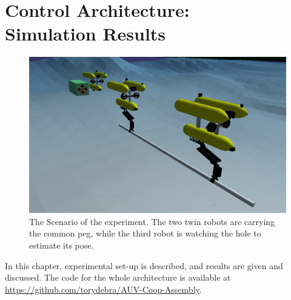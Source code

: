 
\chapter[Control Architecture: Simulation Results]{Control Architecture: \\ Simulation Results}
\label{chap:results}
\ifpdf
\graphicspath{{Results/Figures/PNG/}{Results/Figures/PDF/}{Results/Figures/}}
\else
\graphicspath{{Results/Figures/EPS/}{Results/Figures/}}
\fi

\begin{figure}[H]
	\centering
	\includegraphics[width=14.5cm]{scenario_whole.png}
	\caption[The Scenario with the two robot carrying the peg and the vision robot watching the hole]{The Scenario of the experiment. The two twin robots are carrying the common peg, while the third robot is watching the hole to estimate its pose.}
	\label{fig:method_uwsim}
\end{figure}

In this chapter, experimental set-up is described, and results are given and discussed. The code for the whole architecture is available at \href{https://github.com/torydebra/AUV-Coop-Assembly}{https://github.com/torydebra/AUV-Coop-Assembly}.\\

